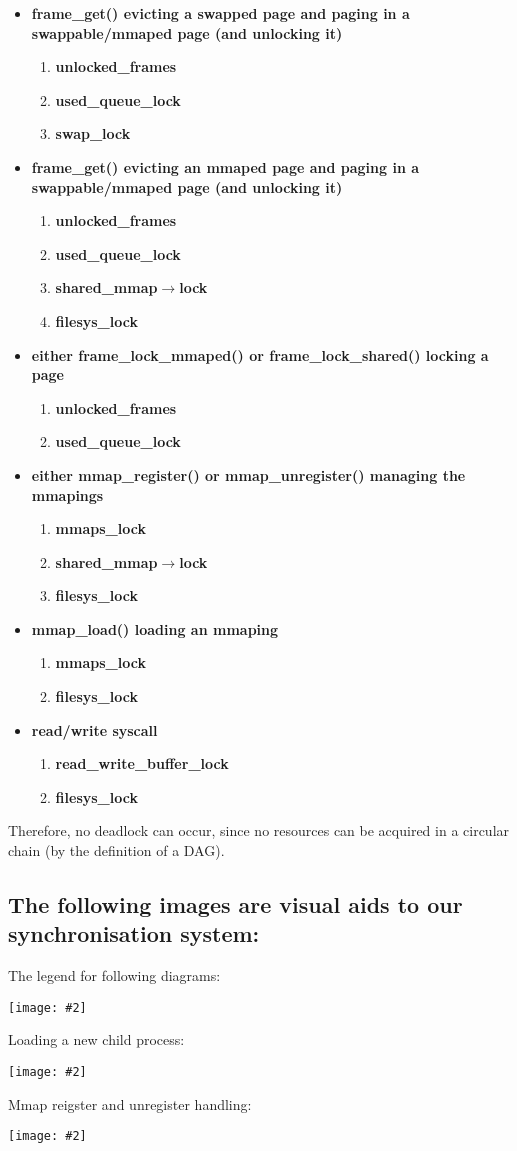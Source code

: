\documentclass{report}
\newcommand{\bullpara}[2]{\item \textbf{#1} \ #2}
\newcommand{\fun}[1]{\textcolor{Emerald}{\textbf{#1}}}
\newcommand{\var}[1]{\textcolor{RoyalPurple}{\textbf{#1}}}
\newcommand{\centerimage}[2]{\begin{center}
	\texttt{[image: \#2]}
\end{center}}
\newcommand{\compitem}[1]{\begin{itemize}\setlength\itemsep{-0.1em}#1\end{itemize}}
\newcommand{\compenum}[1]{\begin{enumerate}\setlength\itemsep{-0.1em}#1\end{enumerate}}
\begin{document}
				\compitem{
					\bullpara{\fun{frame\_get()} evicting a swapped page and paging in a swappable/mmaped page (and unlocking it)}{
						\compenum{
							\item \var{unlocked\_frames}
							\item \var{used\_queue\_lock}
							\item \var{swap\_lock}
						}
					}
					\bullpara{\fun{frame\_get()} evicting an mmaped page and paging in a swappable/mmaped page (and unlocking it)}{
						\compenum{
							\item \var{unlocked\_frames}
							\item \var{used\_queue\_lock}
							\item \var{shared\_mmap$\to$lock}
							\item \var{filesys\_lock}
						}
					}
					\bullpara{either \fun{frame\_lock\_mmaped()} or \fun{frame\_lock\_shared()} locking a page}{
						\compenum{
							\item \var{unlocked\_frames}
							\item \var{used\_queue\_lock}
						}
					}
					\bullpara{either \fun{mmap\_register()} or \fun{mmap\_unregister()} managing the mmapings}{
						\compenum{
							\item \var{mmaps\_lock}
							\item \var{shared\_mmap$\to$lock}
							\item \var{filesys\_lock}
						}
					}
					\bullpara{\fun{mmap\_load()} loading an mmaping}{
						\compenum{
							\item \var{mmaps\_lock}
							\item \var{filesys\_lock}
						}
					}
					\bullpara{\fun{read}/\fun{write} syscall}{
						\compenum{
							\item \var{read\_write\_buffer\_lock}
							\item \var{filesys\_lock}
						}
					}
				}
				Therefore, no deadlock can occur, since no resources can be acquired in a circular chain (by the definition of a DAG).

				\subsection*{The following images are visual aids to our synchronisation system:}
					\begin{minipage}{\textwidth}
						The legend for following diagrams:
						\centerimage{width=\textwidth}{synch legend.png}
					\end{minipage}
					\begin{minipage}{\textwidth}
						Loading a new child process:
						\centerimage{width=\textwidth}{synch load.png}
					\end{minipage}
					\begin{minipage}{\textwidth}
						Mmap reigster and unregister handling:
						\centerimage{width=\textwidth}{synch mmap.png}
					\end{minipage}
\end{document}
